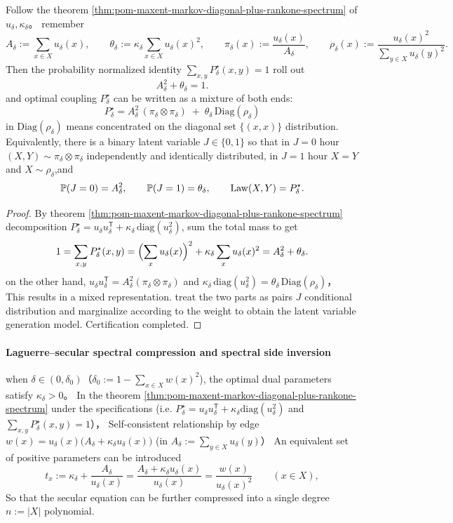 \begin{corollary}\label{cor:pom-maxent-markov-optimal-coupling-latent-binary-mixture}
Follow the theorem \ref{thm:pom-maxent-markov-diagonal-plus-rankone-spectrum} of \(u_\delta,\kappa_\delta\)。
remember
\[
A_\delta:=\sum_{x\in X}u_\delta(x),
\qquad
\theta_\delta:=\kappa_\delta\sum_{x\in X}u_\delta(x)^2,
\qquad
\pi_\delta(x):=\frac{u_\delta(x)}{A_\delta},
\qquad
\rho_\delta(x):=\frac{u_\delta(x)^2}{\sum_{y\in X}u_\delta(y)^2}.
\]
Then the probability normalized identity \(\sum_{x,y}P^\star_\delta(x,y)=1\) roll out
\[
A_\delta^2+\theta_\delta=1.
\]
and optimal coupling \(P^\star_\delta\) can be written as a mixture of both ends:
\[
\boxed{\;
P^\star_\delta
=A_\delta^2\,(\pi_\delta\otimes\pi_\delta)
\;+\;\theta_\delta\,\mathrm{Diag}(\rho_\delta)\;}
\]
in \(\mathrm{Diag}(\rho_\delta)\) means concentrated on the diagonal set \(\{(x,x)\}\) distribution.
Equivalently, there is a binary latent variable \(J\in\{0,1\}\) so that in \(J=0\) hour \((X,Y)\sim\pi_\delta\otimes\pi_\delta\) independently and identically distributed, in \(J=1\) hour \(X=Y\) and \(X\sim\rho_\delta\),and
\[
\mathbb P(J=0)=A_\delta^2,\qquad \mathbb P(J=1)=\theta_\delta,
\qquad
{\rm Law}(X,Y)=P^\star_\delta.
\]
\end{corollary}
\begin{proof}
By theorem \ref{thm:pom-maxent-markov-diagonal-plus-rankone-spectrum} decomposition \(P^\star_\delta=u_\delta u_\delta^{\mathsf T}+\kappa_\delta\,\mathrm{diag}(u_\delta^2)\), sum the total mass to get
\[
1=\sum_{x,y}P^\star_\delta(x,y)=\Bigl(\sum_x u_\delta(x)\Bigr)^2+\kappa_\delta\sum_x u_\delta(x)^2=A_\delta^2+\theta_\delta.
\]
on the other hand,
\(
u_\delta u_\delta^{\mathsf T}=A_\delta^2(\pi_\delta\otimes\pi_\delta)
\)
and
\(
\kappa_\delta\,\mathrm{diag}(u_\delta^2)=\theta_\delta\,\mathrm{Diag}(\rho_\delta)
\)，
This results in a mixed representation.
treat the two parts as pairs \(J\) conditional distribution and marginalize according to the weight to obtain the latent variable generation model. Certification completed.
\end{proof}

\paragraph{Laguerre--secular spectral compression and spectral side inversion}
when \(\delta\in(0,\delta_0)\)（\(\delta_0:=1-\sum_{x\in X}w(x)^2\)), the optimal dual parameters satisfy \(\kappa_\delta>0\)。
In the theorem \ref{thm:pom-maxent-markov-diagonal-plus-rankone-spectrum} under the specifications (i.e. \(P^\star_\delta=u_\delta u_\delta^{\mathsf T}+\kappa_\delta\mathrm{diag}(u_\delta^2)\) and \(\sum_{x,y}P^\star_\delta(x,y)=1\)），
Self-consistent relationship by edge
\(
w(x)=u_\delta(x)\bigl(A_\delta+\kappa_\delta u_\delta(x)\bigr)
\)
(in \(A_\delta:=\sum_{y\in X}u_\delta(y)\)）
An equivalent set of positive parameters can be introduced
\[
t_x:=\kappa_\delta+\frac{A_\delta}{u_\delta(x)}
=\frac{A_\delta+\kappa_\delta u_\delta(x)}{u_\delta(x)}
=\frac{w(x)}{u_\delta(x)^2}\qquad(x\in X),
\]
So that the secular equation can be further compressed into a single degree \(n:=|X|\) polynomial.

